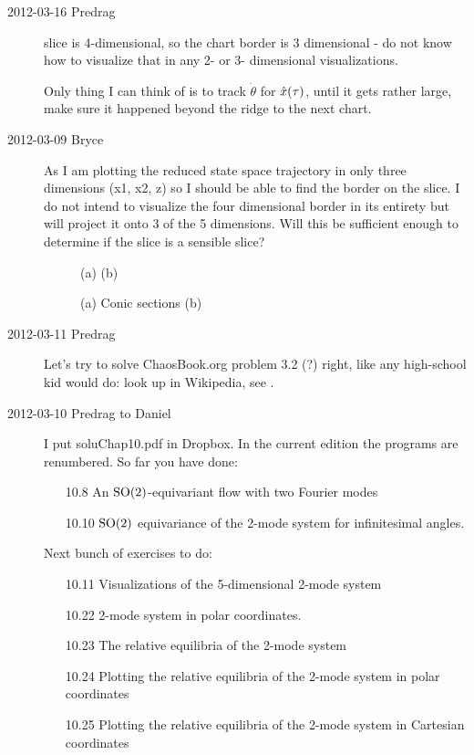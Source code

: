 \begin{description}
\item[2012-03-16 Predrag]
slice is 4-dimensional, so the chart border is 3 dimensional - do not
know how to visualize that in any 2- or 3- dimensional visualizations.

Only thing I can think of is to track $\dot{\theta}$ for $\hat{x}(\tau)$,
until it gets rather large, make sure it happened beyond the ridge to the
next chart.

\item[2012-03-09 Bryce]
As I am plotting the reduced state space trajectory in only three
dimensions (x1, x2, z) so I should be able to find the border on the
slice. I do not intend to visualize the four dimensional border in its
entirety but will project it onto 3 of the 5 dimensions. Will this be
sufficient enough to determine if the slice is a sensible slice?

%
\begin{figure}\label{f:ConicplaneSects}
\centering
(a) %
(b) %
\caption{
(a) Conic sections (b)
}
\end{figure}

\item[2012-03-11 Predrag]
Let's try to solve ChaosBook.org problem 3.2 (?) right, like any
high-school kid would do: look up
 in
Wikipedia, see .

\item[2012-03-10 Predrag to Daniel] I put soluChap10.pdf in Dropbox. In
the current edition the programs are renumbered. So far you have done:
\begin{itemize}
  \item[10.8]  An $\textrm{SO}(2)$-equivariant flow with two Fourier modes
  \item[10.10] $\textrm{SO}(2)$ equivariance of the 2-mode system
           for infinitesimal angles.
\end{itemize}
Next bunch of exercises to do:
\begin{itemize}
  \item[10.11] Visualizations of the 5-dimensional 2-mode system
  \item[10.22] 2-mode system in polar coordinates.
  \item[10.23] The relative equilibria of the 2-mode system
  \item[10.24] Plotting the relative equilibria of
           the 2-mode system in polar coordinates
  \item[10.25] Plotting the relative equilibria of
           the 2-mode system in Cartesian coordinates
\end{itemize}


\end{description}
